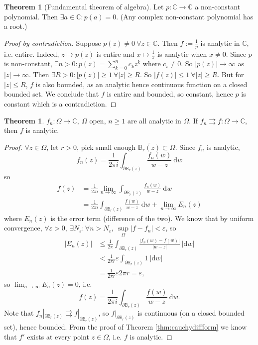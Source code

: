 \documentclass[a4paper]{article}
\theoremstyle{definition}
\newtheorem{thm}[defn]{Theorem}
\begin{document}
\begin{thm}[Fundamental theorem of algebra]
Let $p:\mathbb C\rightarrow \mathbb C$ a non-constant polynomial. Then $\exists a \in \mathbb C:p(a)=0$.
(Any complex non-constant polynomial has a root.)
\end{thm}
\begin{proof}[Proof by contradiction]
Suppose $p(z)\neq 0 \ \forall z\in \mathbb C$. Then $f:=\frac{1}{p}$ is analytic in $\mathbb C$, i.e. entire. Indeed, $z\mapsto p(z)$ is entire and $x\mapsto \frac{1}{x}$ is analytic when $x\neq 0$. Since $p$ is non-constant, $\exists n>0:p(z) =\sum_{k=0}^n c_k z^k$ where $c_i\neq 0$. So $|p(z)| \rightarrow \infty$ as $|z|\rightarrow \infty$. Then $\exists R>0:|p(z)|\geq 1 \ \forall |z| \geq R$. So $|f(z)| \leq 1 \ \forall |z| \geq R$. But for $|z| \leq R$, $f$ is also bounded, as an analytic hence continuous function on a closed bounded set. We conclude that $f$ is entire and bounded, so constant, hence $p$ is constant which is a contradiction.
\end{proof}
\begin{thm}
$f_n:\Omega \rightarrow \mathbb C,\ \Omega$ open, $n\geq 1$ are all analytic in $\Omega$. If $f_n \rightrightarrows f:\Omega \rightarrow \mathbb C$, then $f$ is analytic.
\end{thm}
\begin{proof}
$\forall z\in \Omega$, let $r>0$, pick small enough $\overline{\mathbb B_r(z)} \subset \Omega$. Since $f_n$ is analytic,
\[
f_n(z) = \frac{1}{2\pi i} \int_{\partial \mathbb B_r(z)} \frac{f_n(w)}{w-z} \ \mathrm d w
\]
so
\[
\begin{aligned}
f(z) &= \frac{1}{2\pi i} \lim_{n\rightarrow \infty} \int_{\partial \mathbb B_r(z)} \frac{f_n(w)}{w-z} \ \mathrm d w \\
&=\frac{1}{2\pi i} \int_{\partial \mathbb B_r(z)} \frac{f(w)}{w-z} \ \mathrm d w + \lim_{n\rightarrow \infty} E_n(z)
\end{aligned}
\]
where $E_n(z)$ is the error term (difference of the two). We know that by uniform convergence, $\forall \varepsilon >0,\ \exists N_\varepsilon: \forall n>N_\varepsilon,\ \underset{\Omega}{\sup} |f-f_n| <\varepsilon$, so
\[
\begin{aligned}
|E_n(z)| &\leq \frac{1}{2\pi} \int_{\partial \mathbb B_r(z)} \frac{|f_n(w)-f(w)|}{|w-z|} \ |\mathrm d w| \\
&< \frac{1}{2\pi r} \varepsilon \int_{\partial \mathbb B_r(z)} 1 \ |\mathrm d w| \\
&= \frac{1}{2\pi r} \varepsilon 2\pi r = \varepsilon,
\end{aligned}
\]
so $\lim_{n\rightarrow \infty} E_n(z)=0$, i.e.
\[
f(z)=\frac{1}{2\pi i} \int_{\partial \mathbb B_r(z)} \frac{f(w)}{w-z} \ \mathrm d w.
\]
Note that $f_n|_{\partial \mathbb B_r(z)} \rightrightarrows f|_{\partial \mathbb B_r(z)}$, so $f|_{\partial \mathbb B_r(z)}$ is continuous (on a closed bounded set), hence bounded. From the proof of Theorem \ref{thm:cauchydiffform} we know that $f'$ exists at every point $z\in \Omega$, i.e. $f$ is analytic.
\end{proof}
\end{document}
